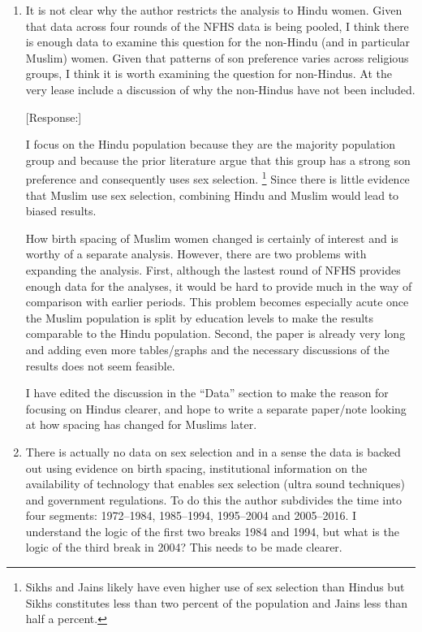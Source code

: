 \documentclass[letterpaper,12pt]{article}
\begin{document}
\begin{enumerate}

\item It is not clear why the author restricts the analysis to Hindu
women. Given that data across four rounds of the NFHS data is being
pooled, I think there is enough data to examine this question for the
non-Hindu (and in particular Muslim) women. Given that patterns of son
preference varies across religious groups, I think it is worth examining
the question for non-Hindus. At the very lease include a discussion of
why the non-Hindus have not been included.

[Response:]

I focus on the Hindu population because they are the majority population group 
and because the prior literature argue that this group has a strong son preference and 
consequently uses sex selection.%
\footnote{
Sikhs and Jains likely have even higher use of sex selection than Hindus but Sikhs 
constitutes less than two percent of the population and Jains less than half a percent.
}
Since there is little evidence that Muslim use sex selection, combining Hindu and Muslim 
would lead to biased results.

How birth spacing of Muslim women changed is certainly of interest and is worthy
of a separate analysis.
However, there are two problems with expanding the analysis.
First, although the lastest round of NFHS provides enough data for the analyses, 
it would be hard to provide much in the way of comparison with earlier periods.
This problem becomes especially acute once the Muslim population is split by education 
levels to make the results comparable to the Hindu population.
Second, the paper is already very long and adding even more tables/graphs and the
necessary discussions of the results does not seem feasible.

I have edited the discussion in the ``Data'' section to make the reason for focusing
on Hindus clearer, and hope to write a separate paper/note looking at how spacing
has changed for Muslims later.





\item There is actually no data on sex selection and in a sense the data
is backed out using evidence on birth spacing, institutional information
on the availability of technology that enables sex selection (ultra
sound techniques) and government regulations. To do this the author
subdivides the time into four segments: 1972--1984, 1985--1994, 1995--2004
and 2005--2016. I understand the logic of the first two breaks 1984 and
1994, but what is the logic of the third break in 2004? This needs to be
made clearer.


\end{enumerate}
\end{document}
